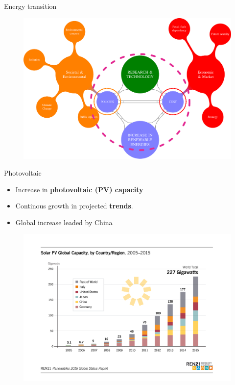 \documentclass{beamer}%
\begin{document}
\begin{frame}[fragile]{Energy transition}
\begin{figure}
\centering\includegraphics[scale=0.42]{diagram5pdf.pdf}
\end{figure} 
\end{frame}


\begin{frame}[fragile]{Photovoltaic}
\begin{itemize}
\item Increase in \textbf{\alert{photovoltaic (PV) capacity}}
\item Continous growth in projected \textbf{\alert{trends}}.
\item Global increase leaded by China  
\end{itemize}
\begin{figure}
\centering\includegraphics[scale=0.3]{GSR_2016_Figure_15}
\end{figure}
\end{frame}
\end{document}
